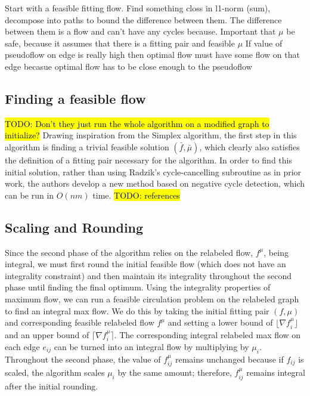 \documentclass[11pt]{article}
\theoremstyle{definition}
\theoremstyle{definition}
\newcommand{\todo}[1]{\hl{TODO: #1}}
\begin{document}
	Start with a feasible fitting flow. Find something closs in l1-norm (sum), decompose into paths to bound the difference between them. The difference between them is a flow and can't have any cycles because.
	Important that $\mu$ be safe, because it assumes that there is a fitting pair and feasible $\mu$
	If value of pseudoflow on edge is really high then optimal flow must have some flow on that edge becasue optimal flow has to be close enough to the pseudoflow
	

    \subsection{Finding a feasible flow}
	\todo{Don't they just run the whole algorithm on a modified graph to initialize?}
	Drawing inspiration from the Simplex algorithm, the first step in this algorithm is finding a trivial feasible solution $(\bar{f}, \bar{\mu})$, which clearly also satisfies the definition of a fitting pair necessary for the algorithm. In order to find this initial solution, rather than using Radzik's cycle-cancelling subroutine as in prior work, the authors develop a new method based on negative cycle detection, which can be run in $O(nm)$ time. \todo{references} 
    
    \subsection{Scaling and Rounding} 
    Since the second phase of the algorithm relies on the relabeled flow, $f^\mu$, being integral, we must first round the initial feasible flow (which does not have an integrality constraint) and then maintain its integrality throughout the second phase until finding the final optimum. Using the integrality properties of maximum flow, we can run a feasible circulation problem on the relabeled graph to find an integral max flow. We do this by taking the initial fitting pair $(f, \mu)$ and corresponding feasible relabeled flow $f^\mu$ and setting a lower bound of $\lfloor \nabla f_i^\mu \rfloor$ and an upper bound of $\lceil \nabla f_i^\mu \rceil$. The corresponding integral relabeled max flow on each edge $e_{ij}$ can be turned into an integral flow by multiplying by $\mu_i$. Throughout the second phase, the value of $f_{ij}^\mu$ remains unchanged because if $f_{ij}$ is scaled, the algorithm scales $\mu_i$ by the same amount; therefore, $f_{ij}^\mu$ remains integral after the initial rounding.
    
\end{document}
